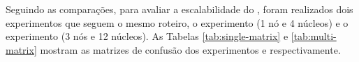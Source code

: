 




Seguindo as comparações, para avaliar a escalabilidade do \mfog, foram
realizados dois experimentos que seguem o mesmo roteiro, o experimento \expC (1
nó e 4 núcleos) e o experimento \expD (3 nós e 12 núcleos).
As Tabelas \ref{tab:single-matrix} e \ref{tab:multi-matrix} mostram as matrizes
de confusão dos experimentos \expC e \expD respectivamente.

